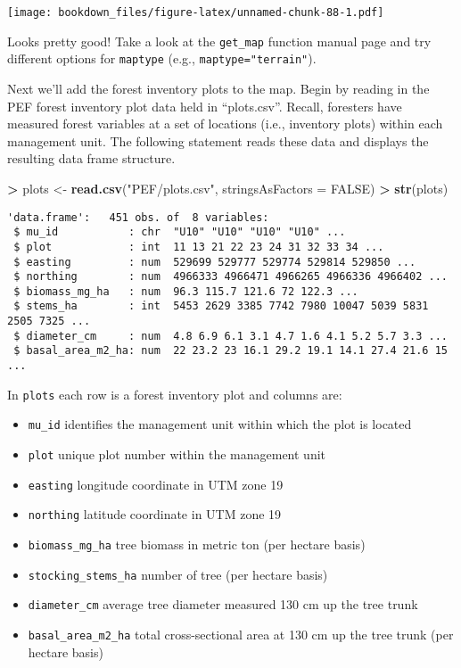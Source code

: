 \documentclass[]{krantz}
\makeatletter
\newenvironment{Shaded}{\begin{snugshade}}{\end{snugshade}}
\newcommand{\KeywordTok}[1]{\textcolor[rgb]{0.27,0.27,0.27}{\textbf{#1}}}
\newcommand{\DataTypeTok}[1]{\textcolor[rgb]{0.27,0.27,0.27}{#1}}
\newcommand{\StringTok}[1]{\textcolor[rgb]{0.5,0.5,0.5}{#1}}
\newcommand{\OtherTok}[1]{\textcolor[rgb]{0.37,0.37,0.37}{#1}}
\newcommand{\OperatorTok}[1]{\textcolor[rgb]{0.43,0.43,0.43}{\textbf{#1}}}
\newcommand{\NormalTok}[1]{#1}
\providecommand{\tightlist}{%
  \setlength{\itemsep}{0pt}\setlength{\parskip}{0pt}}
\newenvironment{kframe}{%
\medskip{}
\setlength{\fboxsep}{.8em}
 \def\at@end@of@kframe{}%
 \ifinner\ifhmode%
  \def\at@end@of@kframe{\end{minipage}}%
  \begin{minipage}{\columnwidth}%
 \fi\fi%
 \def\FrameCommand##1{\hskip\@totalleftmargin \hskip-\fboxsep
 \colorbox{shadecolor}{##1}\hskip-\fboxsep
     \hskip-\linewidth \hskip-\@totalleftmargin \hskip\columnwidth}%
 \MakeFramed {\advance\hsize-\width
   \@totalleftmargin\z@ \linewidth\hsize
   \@setminipage}}%
 {\par\unskip\endMakeFramed%
 \at@end@of@kframe}
\renewenvironment{Shaded}{\begin{kframe}}{\end{kframe}}
\theoremstyle{definition}
\theoremstyle{definition}
\theoremstyle{definition}
\theoremstyle{remark}
\makeatother
\begin{document}
\texttt{[image: bookdown\_files/figure-latex/unnamed-chunk-88-1.pdf]}

Looks pretty good! Take a look at the \texttt{get\_map} function manual
page and try different options for \texttt{maptype} (e.g.,
\texttt{maptype="terrain"}).

Next we'll add the forest inventory plots to the map. Begin by reading
in the PEF forest inventory plot data held in ``plots.csv''. Recall,
foresters have measured forest variables at a set of locations (i.e.,
inventory plots) within each management unit. The following statement
reads these data and displays the resulting data frame structure.

\begin{Shaded}
\begin{Highlighting}[]
\OperatorTok{>}\StringTok{ }\NormalTok{plots <-}\StringTok{ }\KeywordTok{read.csv}\NormalTok{(}\StringTok{"PEF/plots.csv"}\NormalTok{, }\DataTypeTok{stringsAsFactors =} \OtherTok{FALSE}\NormalTok{)}
\OperatorTok{>}\StringTok{ }\KeywordTok{str}\NormalTok{(plots)}
\end{Highlighting}
\end{Shaded}

\begin{verbatim}
'data.frame':   451 obs. of  8 variables:
 $ mu_id           : chr  "U10" "U10" "U10" "U10" ...
 $ plot            : int  11 13 21 22 23 24 31 32 33 34 ...
 $ easting         : num  529699 529777 529774 529814 529850 ...
 $ northing        : num  4966333 4966471 4966265 4966336 4966402 ...
 $ biomass_mg_ha   : num  96.3 115.7 121.6 72 122.3 ...
 $ stems_ha        : int  5453 2629 3385 7742 7980 10047 5039 5831 2505 7325 ...
 $ diameter_cm     : num  4.8 6.9 6.1 3.1 4.7 1.6 4.1 5.2 5.7 3.3 ...
 $ basal_area_m2_ha: num  22 23.2 23 16.1 29.2 19.1 14.1 27.4 21.6 15 ...
\end{verbatim}

In \texttt{plots} each row is a forest inventory plot and columns are:

\begin{itemize}
\tightlist
\item
  \texttt{mu\_id} identifies the management unit within which the plot
  is located
\item
  \texttt{plot} unique plot number within the management unit
\item
  \texttt{easting} longitude coordinate in UTM zone 19
\item
  \texttt{northing} latitude coordinate in UTM zone 19
\item
  \texttt{biomass\_mg\_ha} tree biomass in metric ton (per hectare
  basis)
\item
  \texttt{stocking\_stems\_ha} number of tree (per hectare basis)
\item
  \texttt{diameter\_cm} average tree diameter measured 130 cm up the
  tree trunk
\item
  \texttt{basal\_area\_m2\_ha} total cross-sectional area at 130 cm up
  the tree trunk (per hectare basis)
\end{itemize}
\end{document}
